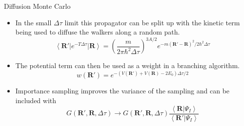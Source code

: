 \documentclass{beamer}
\newcommand{\ket}[1]{\left| #1 \right>}
\newcommand{\bra}[1]{\left< #1 \right|}
\newcommand{\braket}[2]{\left< #1 | #2 \right>}
\newcommand{\R}{\mathbf{R}}
\newcommand{\dt}{\Delta\tau}
\begin{document}
\begin{frame}{Diffusion Monte Carlo}
\begin{itemize}
   \item In the small $\dt$ limit this propagator can be split up with the kinetic term being used to diffuse the walkers along a random path.
   \begin{equation*}
      \bra{\R'}e^{-T\Delta \tau}\ket{\R} = \left(\frac{m}{2\pi\hbar^2\Delta\tau}\right)^{3A/2}e^{-m(\R'-\R)^2/2\hbar^2\Delta\tau}
   \end{equation*}
   \item The potential term can then be used as a weight in a branching algorithm.
   \begin{equation*}
      w(\R') = e^{-\left(V\left(\R'\right)+V\left(\R\right)-2E_0\right)\Delta\tau/2}%
   \end{equation*}
   \item Importance sampling improves the variance of the sampling and can be included with
   \begin{equation*}
      G(\R',\R,\Delta\tau) \rightarrow G(\R',\R,\Delta\tau)\frac{\braket{\R}{\Psi_I}}{\braket{\R'}{\Psi_I}}
   \end{equation*}
\end{itemize}
\end{frame}
\end{document}
